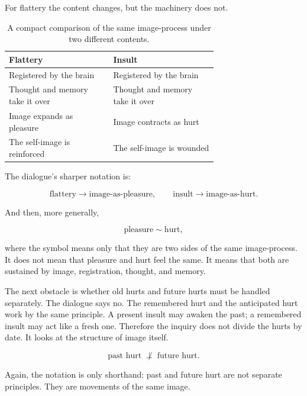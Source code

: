 For flattery the content changes, but the machinery does not.

\begin{table}
\centering
\begin{tabular}{|p{0.35\linewidth}|p{0.35\linewidth}|}
\hline
\textbf{Flattery} & \textbf{Insult} \\
\hline
Registered by the brain & Registered by the brain \\
\hline
Thought and memory take it over & Thought and memory take it over \\
\hline
Image expands as pleasure & Image contracts as hurt \\
\hline
The self-image is reinforced & The self-image is wounded \\
\hline
\end{tabular}
\caption{A compact comparison of the same image-process under two different contents.}
\end{table}

The dialogue's sharper notation is:

\begin{equation}
\text{flattery} \longrightarrow \text{image-as-pleasure},
\qquad
\text{insult} \longrightarrow \text{image-as-hurt}.
\end{equation}

And then, more generally,

\begin{equation}
\text{pleasure} \sim \text{hurt},
\end{equation}

where the symbol means only that they are two sides of the same image-process. It does not mean that pleasure and hurt feel the same. It means that both are sustained by image, registration, thought, and memory.

The next obstacle is whether old hurts and future hurts must be handled separately. The dialogue says no. The remembered hurt and the anticipated hurt work by the same principle. A present insult may awaken the past; a remembered insult may act like a fresh one. Therefore the inquiry does not divide the hurts by date. It looks at the structure of image itself.

\begin{equation}
\text{past hurt}
\;\not\perp\;
\text{future hurt}.
\end{equation}

Again, the notation is only shorthand: past and future hurt are not separate principles. They are movements of the same image.

